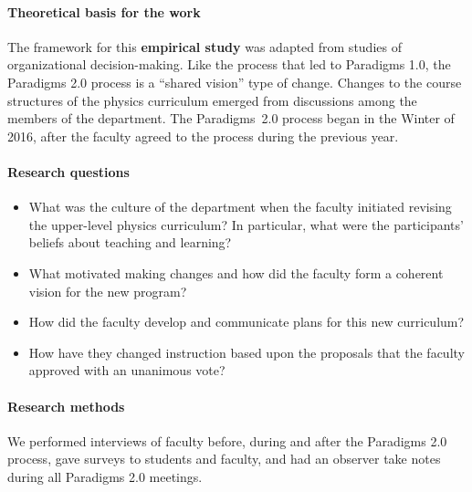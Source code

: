 \documentclass[aps,prstper,reprint]{revtex4-1}
\begin{document}
\paragraph*{Theoretical basis for the work}
The framework for this {\bf empirical study} was adapted from studies
of organizational decision-making\cite{beach2006leadership}.  Like the
process that led to Paradigms 1.0, the Paradigms 2.0 process is a
``shared vision'' type of change\cite{henderson2010}. Changes to the
course structures of the physics curriculum emerged from discussions
among the members of the department. The Paradigms~2.0 process began
in the Winter of 2016, after the faculty agreed to the process during
the previous year.

\paragraph*{Research questions}
\begin{itemize}
\item What was the culture of the department when the faculty initiated revising the upper-level physics curriculum? In
  particular, what were the participants' beliefs about teaching and
  learning?
\item What motivated making changes and how did the faculty form a
  coherent vision for the new program?
\item How did the faculty develop and communicate plans for this new
  curriculum?
\item How have they changed instruction based upon the proposals that
  the faculty approved with an unanimous vote?
\end{itemize}
\paragraph*{Research methods}
We performed interviews of faculty before, during and after the
Paradigms 2.0 process, gave surveys to students and faculty, and had
an observer take notes during all Paradigms 2.0 meetings.

\end{document}
